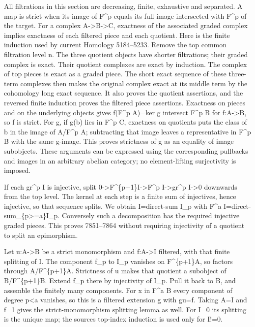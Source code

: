 All filtrations in this section are decreasing,\allowbreak{} finite,\allowbreak{} exhaustive and separated. A map is strict when its image of F\^{}p equals its full image intersected with F\^{}p of the target. For a complex A\allowbreak{}->B\allowbreak{}->C,\allowbreak{} exactness of the associated graded complex implies exactness of each filtered piece and each quotient. Here is the finite induction used by current Homology 5184–\allowbreak{}5233. Remove the top common filtration level n. The three quotient objects have shorter filtrations; their graded complex is exact. Their quotient complexes are exact by induction. The complex of top pieces is exact as a graded piece. The short exact sequence of these three-term complexes then makes the original complex exact at its middle term by the cohomology long exact sequence. It also proves the quotient assertions,\allowbreak{} and the reversed finite induction proves the filtered piece assertions. Exactness on pieces and on the underlying objects gives f(F\^{}p A)\allowbreak{}\allowbreak{}=ker g intersect F\^{}p B for f:\allowbreak{}A\allowbreak{}->B,\allowbreak{} so f is strict. For g,\allowbreak{} if g(b)\allowbreak{} lies in F\^{}p C,\allowbreak{} exactness on quotients puts the class of b in the image of A/\allowbreak{}F\textasciicircum{}p A; subtracting that image leaves a representative in F\^{}p B with the same g-image. This proves strictness of g as an equality of image subobjects. These arguments can be expressed using the corresponding pullbacks and images in an arbitrary abelian category; no element-lifting surjectivity is imposed.

If each gr\^{}p I is injective,\allowbreak{} split 0\allowbreak{}->F\textasciicircum{}\{p\allowbreak{}+1\}I\allowbreak{}->F\textasciicircum{}p I\allowbreak{}->gr\textasciicircum{}p I\allowbreak{}->0 downwards from the top level. The kernel at each step is a finite sum of injectives,\allowbreak{} hence injective,\allowbreak{} so that sequence splits. We obtain I\allowbreak{}=direct-sum I\_\allowbreak{}p with F\^{}a I\allowbreak{}=direct-sum\_\allowbreak{}\{p>\allowbreak{}=a\}I\_\allowbreak{}p. Conversely such a decomposition has the required injective graded pieces. This proves 7851–\allowbreak{}7864 without requiring injectivity of a quotient to split an epimorphism.

Let u:\allowbreak{}A\allowbreak{}->B be a strict monomorphism and f:\allowbreak{}A\allowbreak{}->I filtered,\allowbreak{} with that finite splitting of I. The component f\_\allowbreak{}p to I\_\allowbreak{}p vanishes on F\textasciicircum{}\{p\allowbreak{}+1\}A,\allowbreak{} so factors through A/\allowbreak{}F\textasciicircum{}\{p\allowbreak{}+1\}A. Strictness of u makes that quotient a subobject of B/\allowbreak{}F\textasciicircum{}\{p\allowbreak{}+1\}B. Extend f\_\allowbreak{}p there by injectivity of I\_\allowbreak{}p. Pull it back to B,\allowbreak{} and assemble the finitely many components. For x in F\^{}a B every component of degree p\textless a vanishes,\allowbreak{} so this is a filtered extension g with gu\allowbreak{}=f. Taking A\allowbreak{}=I and f\allowbreak{}=1 gives the strict-monomorphism splitting lemma as well. For I\allowbreak{}=0 its splitting is the unique map; the source\textquotesingle s top-index induction is used only for I!\allowbreak{}=0.

